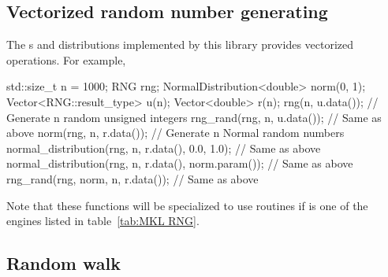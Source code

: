 \subsection{Vectorized random number generating}
\label{sub:Vectorized random number generating}

The \rng{}s and distributions implemented by this library provides vectorized
operations. For example,
\begin{cppcode}
  std::size_t n = 1000;
  RNG rng;
  NormalDistribution<double> norm(0, 1);
  Vector<RNG::result_type> u(n);
  Vector<double> r(n);
  rng(n, u.data());           // Generate n random unsigned integers
  rng_rand(rng, n, u.data()); // Same as above
  norm(rng, n, r.data());     // Generate n Normal random numbers
  normal_distribution(rng, n, r.data(), 0.0, 1.0);     // Same as above
  normal_distribution(rng, n, r.data(), norm.param()); // Same as above
  rng_rand(rng, norm, n, r.data());                    // Same as above
\end{cppcode}
Note that these functions will be specialized to use \mkl routines if
 is one of the engines listed in table~\ref{tab:MKL RNG}.

\subsection{Random walk}
\label{sub:Random walk}

